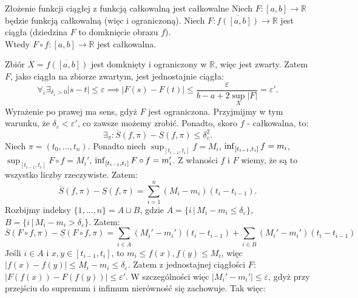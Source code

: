 \documentclass{article}
\numberwithin{defi}{section}
\numberwithin{defi}{section}
\newcommand{\R}{\mathbb{R}}
\renewcommand{\inf}{\mathop{\mathrm{inf}\vphantom{\mathrm{sup}}}}
\newcommand{\Sd}{\underline{S}}
\newcommand{\Sg}{\overline{S}}
\providecommand{\ol}{\overline}
\providecommand{\eps}{\varepsilon}
\renewcommand{\leq}{\leqslant}
\begin{document}
\begin{twier}{Złożenie funkcji ciągłej z funkcją całkowalną jest całkowalne}
    Niech $F: [a, b] \to \R$ będzie funkcją całkowalną (więc i ograniczoną). Niech $F: \ol{f([a, b])} \to \R$ jest ciągła (dziedzina $F$ to domknięcie obrazu $f$). \\
    Wtedy $F \circ f: [a, b] \to \R$ jest całkowalna.
\end{twier}



\begin{dow}{}
    Zbiór $X = \ol{f([a, b])}$ jest domknięty i ograniczony w $\R$, więc jest zwarty. Zatem $F$, jako ciągła na zbiorze zwartym, jest jednostajnie ciągła: \begin{equation*}
        \forall_{\eps} \exists_{\delta_\eps >0 } | s - t| \leq \eps \implies | F(s) - F(t) | \leq \frac{\eps}{b - a + 2 \sup_{X} |F|}  = \eps'. 
    \end{equation*}  Wyrażenie po prawej ma sens, gdyż $F$ jest ograniczona. Przyjmijmy w tym warunku, że $\delta_\eps < \eps'$, co zawsze możemy zrobić. Ponadto, skoro $f$ - całkowalna, to: \begin{equation*}
        \exists_\pi: \Sg(f, \pi) - \Sd(f, \pi) \leq \delta_\eps^2.
    \end{equation*} Niech $\pi = (t_0, ..., t_n)$. Ponadto niech $\sup_{[t_{i-1}, t_{i} ]} f = M_i$, $\inf_{[t_{i-1}, t_{i} ]} f = m_i$,  $\sup_{[t_{i-1}, t_{i} ]} F \circ f = M_i'$, $\inf_{[t_{i-1}, t_{i} ]} F \circ f = m_i'$. Z właności $f$ i $F$ wiemy, że są to wszystko liczby rzeczywiste. Zatem: \begin{equation*}
        \Sg(f, \pi) - \Sd(f, \pi)  = \sum_{i = 1}^{n} (M_i - m_i) (t_i - t_{i-1}).
    \end{equation*} Rozbijmy indeksy $\{1, ..., n\} = A \sqcup B$, gdzie $A = \{i \, | \, M_i - m_i \leqslant \delta_\eps \}$, $B = \{i \, | \, M_i - m_i > \delta_\eps \}$. Zatem: \begin{equation*}
        \Sg(F \circ f, \pi) - \Sd(F \circ f, \pi)  = \sum_{i \in A} (M_i' - m_i') (t_i - t_{i-1}) + \sum_{i \in B} (M_i' - m_i') (t_i - t_{i-1})
    \end{equation*} Jeśli $i \in A$ i $x, y \in [t_{i -1}, t_i]$, to $m_i \leq f(x), f(y) \leq M_i$, więc $|f(x) - f(y)| \leq M_i - m_i \leq \delta_\eps$. Zatem z jednostajnej ciągłości $F$: $|F(f(x)) - F(f(y))|  \leq \eps'$. W szczególności więc $|M_i' - m_i'| \leq \eps$, gdyż przy przejściu do supremum i infimum nierówność się zachowuje. Tak więc: \begin{equation*}

\end{equation*}
\end{dow}
\end{document}

